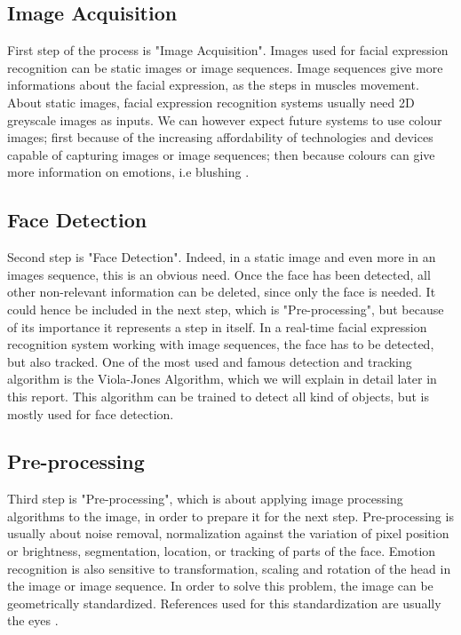 \subsection{Image Acquisition}

\vspace{\baselineskip}
\noindent First step of the process is "Image Acquisition". Images used for facial expression recognition can be static images or image sequences. Image sequences give more informations about the facial expression, as the steps in muscles movement. About static images, facial expression recognition systems usually need 2D greyscale images as inputs. We can however expect future systems to use colour images; first because of the increasing affordability of technologies and devices capable of capturing images or image sequences; then because colours can give more information on emotions, i.e blushing \cite{CHI03}.
\newline

\subsection{Face Detection}

\vspace{\baselineskip}
\noindent Second step is "Face Detection". Indeed, in a static image and even more in an images sequence, this is an obvious need. Once the face has been detected, all other non-relevant information can be deleted, since only the face is needed. It could hence be included in the next step, which is "Pre-processing", but because of its importance it represents a step in itself. In a real-time facial expression recognition system working with image sequences, the face has to be detected, but also tracked. One of the most used and famous detection and tracking algorithm is the Viola-Jones Algorithm, which we will explain in detail later in this report. This algorithm can be trained to detect all kind of objects, but is mostly used for face detection. 
\newline

\subsection{Pre-processing}

\vspace{\baselineskip}
\noindent Third step is "Pre-processing", which is about applying image processing algorithms to the image, in order to prepare it for the next step. Pre-processing is usually about noise removal, normalization against the variation of pixel position or brightness, segmentation, location, or tracking of parts of the face. Emotion recognition is also sensitive to transformation, scaling and rotation of the head in the image or image sequence. In order to solve this problem, the image can be geometrically standardized. References used for this standardization are usually the eyes \cite{CHI03}.
\newline

